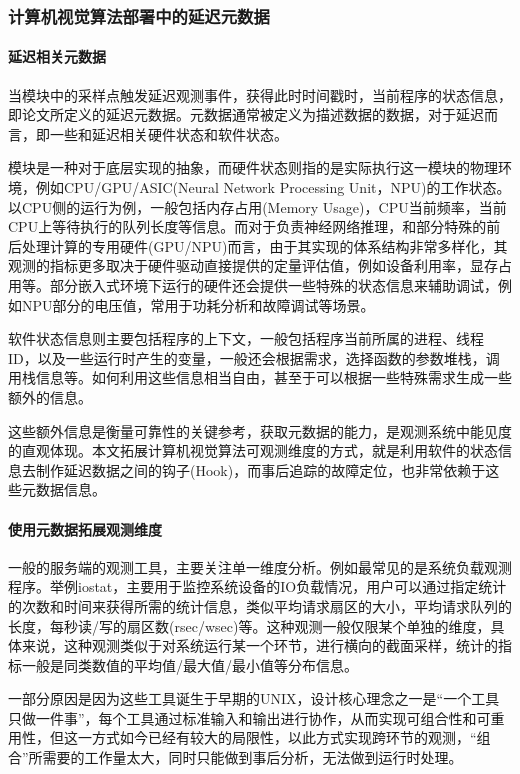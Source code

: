 \documentclass[master,anonymous]{shtthesis}
\begin{document}
\subsubsection{计算机视觉算法部署中的延迟元数据}\label{计算机视觉算法部署中的延迟元数据}
\paragraph{延迟相关元数据}
当模块中的采样点触发延迟观测事件，获得此时时间戳时，当前程序的状态信息，即论文所定义的延迟元数据。元数据通常被定义为描述数据的数据，对于延迟而言，即一些和延迟相关硬件状态和软件状态。

模块是一种对于底层实现的抽象，而硬件状态则指的是实际执行这一模块的物理环境，例如CPU/GPU/ASIC(Neural Network Processing Unit，NPU)的工作状态。以CPU侧的运行为例，一般包括内存占用(Memory Usage)，CPU当前频率，当前CPU上等待执行的队列长度等信息。而对于负责神经网络推理，和部分特殊的前后处理计算的专用硬件(GPU/NPU)而言，由于其实现的体系结构非常多样化，其观测的指标更多取决于硬件驱动直接提供的定量评估值，例如设备利用率，显存占用等。部分嵌入式环境下运行的硬件还会提供一些特殊的状态信息来辅助调试，例如NPU部分的电压值，常用于功耗分析和故障调试等场景。

软件状态信息则主要包括程序的上下文，一般包括程序当前所属的进程、线程ID，以及一些运行时产生的变量，一般还会根据需求，选择函数的参数堆栈，调用栈信息等。如何利用这些信息相当自由，甚至于可以根据一些特殊需求生成一些额外的信息。

这些额外信息是衡量可靠性的关键参考，获取元数据的能力，是观测系统中能见度的直观体现。本文拓展计算机视觉算法可观测维度的方式，就是利用软件的状态信息去制作延迟数据之间的钩子(Hook)，而事后追踪的故障定位，也非常依赖于这些元数据信息。
\paragraph{使用元数据拓展观测维度}\label{使用元数据拓展观测维度}
一般的服务端的观测工具，主要关注单一维度分析。例如最常见的是系统负载观测程序。举例iostat\cite{chandran2014monitoring}，主要用于监控系统设备的IO负载情况，用户可以通过指定统计的次数和时间来获得所需的统计信息，类似平均请求扇区的大小，平均请求队列的长度，每秒读/写的扇区数(rsec/wsec)等。这种观测一般仅限某个单独的维度，具体来说，这种观测类似于对系统运行某一个环节，进行横向的截面采样，统计的指标一般是同类数值的平均值/最大值/最小值等分布信息。

一部分原因是因为这些工具诞生于早期的UNIX，设计核心理念之一是“一个工具只做一件事”，每个工具通过标准输入和输出进行协作，从而实现可组合性和可重用性，但这一方式如今已经有较大的局限性，以此方式实现跨环节的观测，“组合”所需要的工作量太大，同时只能做到事后分析，无法做到运行时处理。
\end{document}
